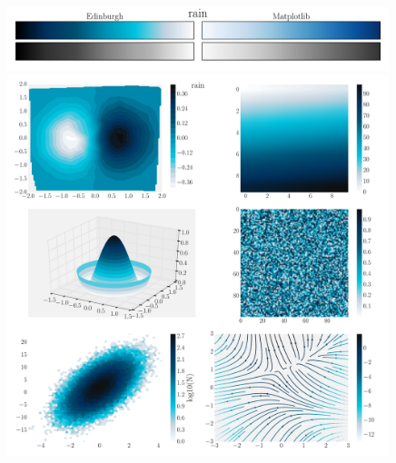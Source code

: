 \documentclass[10pt,a4paper]{article}
\begin{document}
\newpage
\begin{figure}[ht]
  \centering
  \includegraphics[width=0.99\textwidth]{rainBars.pdf}
  \includegraphics[width=0.99\textwidth]{rainExamples.pdf}
\end{figure}
\end{document}
